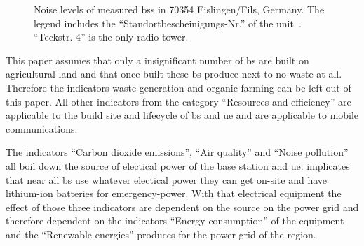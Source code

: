 \documentclass[11pt,a4paper]{article}
\begin{document}
\begin{figure}[h]
  \centering
  \caption{Noise levels of measured \acrshort{bs}s in 70354 Eislingen/Fils, Germany. The legend includes the \enquote{Standortbescheinigungs-Nr.} of the unit~\citep{EMFKarte}. \enquote{Teckstr. 4} is the only radio tower.}\label{fig:noise-measurements}
\end{figure}

This paper assumes that only a insignificant number of \acrshort{bs} are built on agricultural land and that once built these \acrshort{bs} produce next to no waste at all.
Therefore the indicators waste generation and organic farming can be left out of this paper.
All other indicators from the category \enquote{Resources and efficiency} are applicable to the build site and lifecycle of \acrshort{bs} and \acrshort{ue} and are applicable to mobile communications.


The indicators \enquote{Carbon dioxide emissions}, \enquote{Air quality} and \enquote{Noise pollution} all boil down the source of electical power of the base station and \acrshort{ue}.
\citep{powerwhitepaper} implicates that near all \acrshort{bs} use whatever electical power they can get on-site and have lithium-ion batteries for emergency-power.
With that electrical equipment the effect of those three indicators are dependent on the source on the power grid and therefore dependent on the indicators \enquote{Energy consumption} of the equipment and the \enquote{Renewable energies} produces for the power grid of the region.
\end{document}
